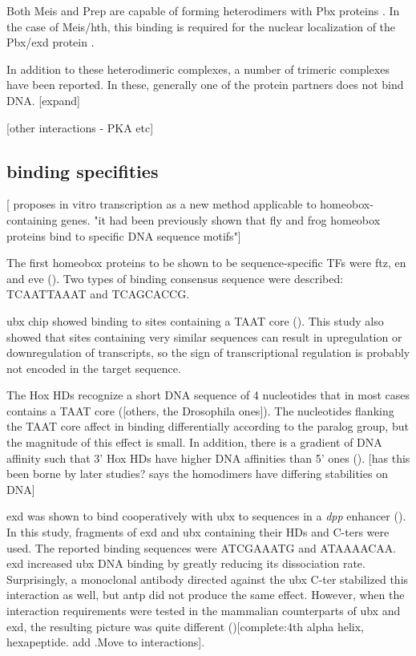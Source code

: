 Both Meis and Prep are capable of forming heterodimers with Pbx proteins \cite{ref}. In the case of Meis/\ac{hth}, this binding is required for the nuclear localization of the Pbx/\ac{exd} protein \cite{ref}. 

In addition to these heterodimeric complexes, a number of trimeric complexes have been reported. In these, generally one of the protein partners does not bind DNA. [expand]

		[other interactions - PKA etc]

\subsection{binding specifities}
		
[\cite{Levine1988} proposes in vitro transcription as a new method applicable to homeobox-containing genes. "it had been previously shown that fly and frog homeobox proteins bind to specific DNA sequence motifs"]
		
The first homeobox proteins to be shown to be sequence-specific \acp{TF} were \ac{ftz}, \ac{en} and \ac{eve} (\cite{Desplan1988,Hoey1988,Hoey1988a}). Two types of binding consensus sequence were described: TCAATTAAAT and TCAGCACCG.
		
\ac{ubx} \ac{chip} showed binding to sites containing a TAAT core (\cite{Gould1990}). This study also showed that sites containing very similar sequences can result in upregulation or downregulation of transcripts, so the sign of transcriptional regulation is probably not encoded in the target sequence.


The Hox \acp{HD} recognize a short DNA sequence of 4 nucleotides that in most cases contains a TAAT core (\cite{Treisman1992,Catron1993}[others, the Drosophila ones]). The nucleotides flanking the TAAT core affect in binding differentially according to the paralog group, but the magnitude of this effect is small. In addition, there is a gradient of DNA affinity such that 3' Hox \acp{HD} have higher DNA affinities than 5' ones (\cite{Pellerin1994}). [has this been borne by later studies? \cite{Shen1997a} says the homodimers have differing stabilities on DNA]

\ac{exd} was shown to bind cooperatively with \ac{ubx} to sequences in a \textit{dpp} enhancer (\cite{Chan1994}). In this study, fragments of \ac{exd} and \ac{ubx} containing their \acp{HD} and \acp{C-ter} were used. The reported binding sequences were ATCGAAATG and ATAAAACAA. \ac{exd} increased \ac{ubx} DNA binding by greatly reducing its dissociation rate. Surprisingly, a monoclonal antibody directed against the \ac{ubx} \ac{C-ter} stabilized this interaction as well, but \ac{antp} did not produce the same effect. However, when the interaction requirements were tested in the mammalian counterparts of \ac{ubx} and \ac{exd}, the resulting picture was quite different (\cite{Chang1995})[complete:4th alpha helix, hexapeptide. add \cite{Lu1996}.Move to interactions].

